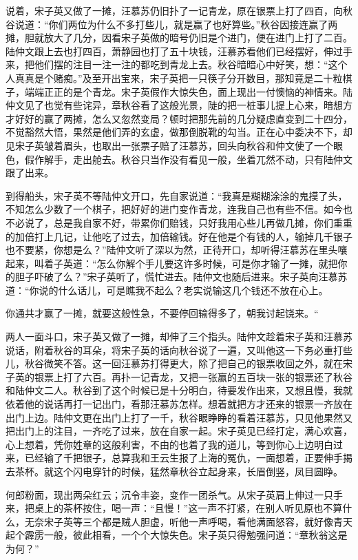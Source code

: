 \documentclass[12pt,UTF8]{ctexbook}
\begin{document}
{{{说着，宋子英又做了一摊，汪慕苏仍旧扑了一记青龙，原在银票上打了四百，向秋谷说道：“你们两位为什么不多打些儿，就是赢了也好算些。”秋谷因接连赢了两摊，胆就放大了几分，因看宋子英做的暗号仍旧是个进门，便在进门上打了二百。陆仲文跟上去也打四百，萧静园也打了五十块钱，汪慕苏看他们已经摆好，伸过手来，把他们摆的注目一注一注的都吃到青龙上去。秋谷暗暗心中好笑，想：“这个人真真是个赌痴。”及至开出宝来，宋子英把一只筷子分开数目，那知竟是二十粒棋子，端端正正的是个青龙。宋子英假作大惊失色，面上现出一付懊恼的神情来。陆仲文见了也觉有些诧异，章秋谷看了这般光景，陡的把一桩事儿提上心来，暗想方才好好的赢了两摊，怎么又忽然变局？顿时把那先前的几分疑虑直变到二十四分，不觉豁然大悟，果然是他们弄的玄虚，做那倒脱靴的勾当。正在心中委决不下，却见宋子英皱着眉头，也取出一张票子赔了汪慕苏，回头向秋谷和仲文使了一个眼色，假作解手，走出舱去。秋谷只当作没有看见一般，坐着兀然不动，只有陆仲文跟了出来。

到得船头，宋子英不等陆仲文开口，先自家说道：“我真是糊糊涂涂的鬼摸了头，不知怎么少数了一个棋子，把好好的进门变作青龙，连我自己也有些不信。如今也不必说了，总是我自家不好，带累你们赔钱，只好我用心些儿再做几摊，你们重重的加倍打上几记，让他吃了过去，加倍输钱。好在他是个有钱的人，输掉几千银子也不要紧，你想是么？”陆仲文听了深以为然，正待开口，却听得汪慕苏在里头嚷起来，叫着子英道：“怎么你解个手儿要这许多时候，可是你才输了一摊，就把你的胆子吓破了么？”宋子英听了，慌忙进去。陆仲文也随后进来。宋子英向汪慕苏道：“你说的什么话儿，可是瞧我不起么？老实说输这几个钱还不放在心上。

你通共才赢了一摊，就要这般性急，不要停回输得多了，朝我讨起饶来。“

两人一面斗口，宋子英又做了一摊，却伸了三个指头。陆仲文趁着宋子英和汪慕苏说话，附着秋谷的耳朵，将宋子英的话向秋谷说了一遍，又叫他这一下务必重打些儿，秋谷微笑不答。这一回汪慕苏打得更大，除了把自己的银票收回之外，就在宋子英的银票上打了六百。再扑一记青龙，又把一张赢的五百块一张的银票还了秋谷和陆仲文二人。秋谷到了这个时候已是十分明白，待要发作出来，又想且慢，我就依着他的说话再打一记出门，看那汪慕苏怎样。想着就把方才还来的银票一齐放在出门上边。陆仲文更在出门上打了一千，秋谷眼睁睁的看着汪慕苏，只见他果然又把出门上的注目，一齐吃了过来，放在自家一起。宋子英见已经打定，满心欢喜，心上想着，凭你姓章的这般利害，不由的也着了我的道儿，等到你心上边明白过来，已经输了千把银子，总算我和王云生报了上海的冤仇，一面想着，正要伸手揭去茶杯。就这个闪电穿针的时候，猛然章秋谷立起身来，长眉倒竖，凤目圆睁。

何郎粉面，现出两朵红云；沉令丰姿，变作一团杀气。从宋子英肩上伸过一只手来，把桌上的茶杯按住，喝一声：“且慢！”这一声不打紧，在别人听见原也不算什么，无奈宋子英等三个都是贼人胆虚，听他一声呼喝，看他满面怒容，就好像青天起个霹雳一般，彼此相看，一个个大惊失色。宋子英只得勉强问道：“章秋翁这是为何？”

}}}
\end{document}
